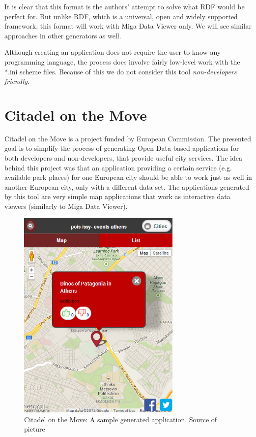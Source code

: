 It is clear that this format is the authors' attempt to solve what RDF would be perfect for. But unlike RDF, which is a universal, open and widely supported framework, this format will work with Miga Data Viewer only. We will see similar approaches in other generators as well.

Although creating an application does not require the user to know any programming language, the process does involve fairly low-level work with the *.ini scheme files. Because of this we do not consider this tool \emph{non-developers friendly}.

\section{Citadel on the Move}

Citadel on the Move \cite{citadel_home} is a project \cite{citadel_paper} funded by European Commission. The presented goal is to simplify the process of generating Open Data based applications for both developers and non-developers, that provide useful city services. The idea behind this project was that an application providing a certain service (e.g. available park places) for one European city should be able to work just as well in another European city, only with a different data set. The applications generated by this tool are very simple map applications that work as interactive data viewers (similarly to Miga Data Viewer).
%
%
%

\begin{figure}
	\centering
	\includegraphics[width=80mm]{img/02_citadel_on_the_move_app.jpg}
	\caption{Citadel on the Move: A sample generated application. Source of picture \cite{citadel_agt_doc}}
	\label{fig:citadel-on-the-move}
\end{figure}

